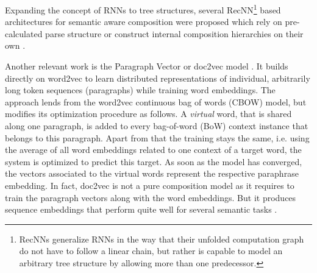 Expanding the concept of \acp{RNN} to tree structures, several \acf{RecNN}\footnote{\acp{RecNN} generalize \acp{RNN} in the way that their unfolded computation graph do not have to follow a linear chain, but rather is capable to model an arbitrary tree structure by allowing more than one predecessor.} \autocite{goller_learning_1996} based architectures for semantic aware composition were proposed which rely on pre-calculated parse structure \autocite{socher_dynamic_2011,socher_semantic_2012,socher_recursive_2013,irsoy_deep_2014,tai_improved_2015,wieting_paraphrase_2015} or construct internal composition hierarchies on their own \autocite{zhao_self-adaptive_2015,chen_sentence_2015}. 

Another relevant work is the Paragraph Vector or doc2vec model \autocite{le_distributed_2014}. It builds directly on word2vec \autocite{mikolov_distributed_2013} to learn distributed representations of individual, arbitrarily long token sequences (paragraphs) while training word embeddings. The approach lends from the word2vec continuous bag of words (CBOW) model, but modifies its optimization procedure as follows. A \textit{virtual} word, that is shared along one paragraph, is added to every bag-of-word (BoW) context instance that belongs to this paragraph. Apart from that the training stays the same, i.e. using the average of all word embeddings related to one context of a target word, the system is optimized to predict this target. As soon as the model has converged, the vectors associated to the virtual words represent the respective paraphrase embedding. In fact, doc2vec is not a pure composition model as it requires to train the paragraph vectors along with the word embeddings. But it produces sequence embeddings that perform quite well for several semantic tasks \autocite{lau_empirical_2016}.






